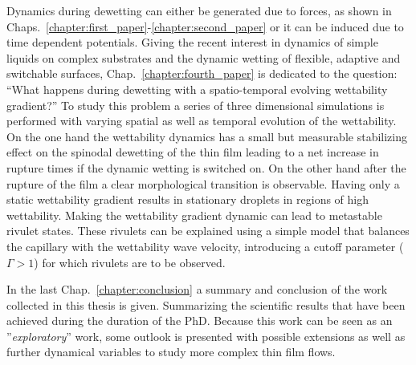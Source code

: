 Dynamics during dewetting can either be generated due to forces, as shown in Chaps.~\ref{chapter:first_paper}-\ref{chapter:second_paper} or it can be induced due to time dependent potentials. 
Giving the recent interest in dynamics of simple liquids on complex substrates and the dynamic wetting of flexible, adaptive and switchable surfaces, Chap.~\ref{chapter:fourth_paper} is dedicated to the question: ``What happens during dewetting with a spatio-temporal evolving wettability gradient?''
To study this problem a series of three dimensional simulations is performed with varying spatial as well as temporal evolution of the wettability.
On the one hand the wettability dynamics has a small but measurable stabilizing effect on the spinodal dewetting of the thin film leading to a net increase in rupture times if the dynamic wetting is switched on.
On the other hand after the rupture of the film a clear morphological transition is observable.
Having only a static wettability gradient results in stationary droplets in regions of high wettability.
Making the wettability gradient dynamic can lead to metastable rivulet states.
These rivulets can be explained using a simple model that balances the capillary with the wettability wave velocity, introducing a cutoff parameter ($\Gamma > 1$) for which rivulets are to be observed.

In the last Chap.~\ref{chapter:conclusion} a summary and conclusion of the work collected in this thesis is given.
Summarizing the scientific results that have been achieved during the duration of the PhD.
Because this work can be seen as an ''\textit{exploratory}'' work, some outlook is presented with possible extensions as well as further dynamical variables to study more complex thin film flows. 